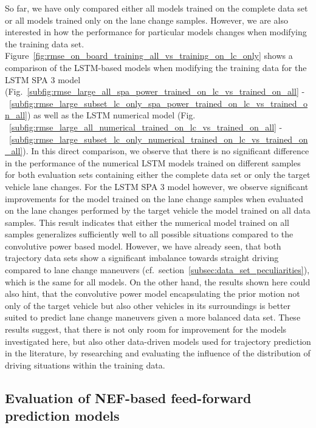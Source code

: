 So far, we have only compared either all models trained on the complete data set or all models trained only on the lane change samples.
However, we are also interested in how the performance for particular models changes when modifying the training data set.
Figure~\ref{fig:rmse_on_board_training_all_vs_training_on_lc_only} shows a comparison of the \ac{LSTM}-based models when modifying the training data for the \ac{LSTM} \acs{SPA} \num{3} model (Fig.~\ref{subfig:rmse_large_all_spa_power_trained_on_lc_vs_trained_on_all} -~\ref{subfig:rmse_large_subset_lc_only_spa_power_trained_on_lc_vs_trained_on_all}) as well as the \acs{LSTM} numerical model (Fig.
~\ref{subfig:rmse_large_all_numerical_trained_on_lc_vs_trained_on_all} -~\ref{subfig:rmse_large_subset_lc_only_numerical_trained_on_lc_vs_trained_on_all}).
In this direct comparison, we observe that there is no significant difference in the performance of the numerical \ac{LSTM} models trained on different samples for both evaluation sets containing either the complete data set or only the target vehicle lane changes.
For the \ac{LSTM} \acs{SPA} \num{3} model however, we observe significant improvements for the model trained on the lane change samples when evaluated on the lane changes performed by the target vehicle the model trained on all data samples.
This result indicates that either the numerical model trained on all samples generalizes sufficiently well to all possible situations compared to the convolutive power based model.
However, we have already seen, that both trajectory data sets show a significant imbalance towards straight driving compared to lane change maneuvers (cf.\ section~\ref{subsec:data_set_peculiarities}), which is the same for all models.
On the other hand, the results shown here could also hint, that the convolutive power model encapsulating the prior motion not only of the target vehicle but also other vehicles in its surroundings is better suited to predict lane change maneuvers given a more balanced data set.
These results suggest, that there is not only room for improvement for the models investigated here, but also other data-driven models used for trajectory prediction in the literature, by researching and evaluating the influence of the distribution of driving situations within the training data.

\subsection{Evaluation of \acs{NEF}-based feed-forward prediction models}%
\label{subsec:evaluation_of_nef_based_feed_forward_prediction_models}

